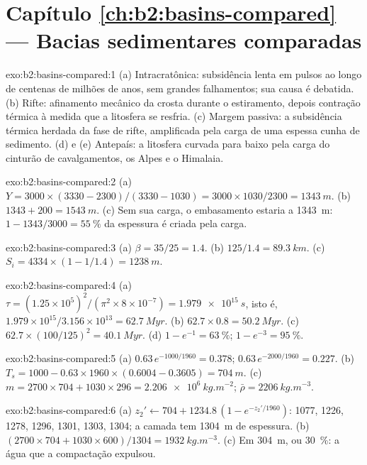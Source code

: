 \section*{Capítulo \ref{ch:b2:basins-compared} --- Bacias sedimentares comparadas}

\begin{solution}{exo:b2:basins-compared:1}
(a) Intracratônica: subsidência lenta em pulsos ao longo de centenas de milhões de anos, sem grandes
falhamentos; sua causa é debatida. (b) Rifte: afinamento mecânico da crosta durante o estiramento,
depois contração térmica à medida que a litosfera se resfria. (c) Margem passiva: a subsidência térmica
herdada da fase de rifte, amplificada pela carga de uma espessa cunha de sedimento. (d) e (e)
Antepaís: a litosfera curvada para baixo pela carga do cinturão de cavalgamentos, os Alpes e o Himalaia.
\end{solution}

\begin{solution}{exo:b2:basins-compared:2}
(a) $Y = 3000\times(3330 - 2300)/(3330 - 1030) = 3000\times1030/2300 = \qty{1343}{m}$.
(b) $1343 + 200 = \qty{1543}{m}$. (c) Sem sua carga, o embasamento estaria a \qty{1343}{m}:
$1 - 1343/3000 = \qty{55}{\percent}$ da espessura é criada pela carga.
\end{solution}

\begin{solution}{exo:b2:basins-compared:3}
(a) $\beta = 35/25 = 1.4$. (b) $125/1.4 = \qty{89.3}{km}$. (c) $S_i = 4334\times(1 - 1/1.4) =
\qty{1238}{m}$.
\end{solution}

\begin{solution}{exo:b2:basins-compared:4}
(a) $\tau = (1.25\times10^{5})^2/(\pi^2\times8\times10^{-7}) = \qty{1.979e15}{s}$, isto é,
$1.979\times10^{15}/3.156\times10^{13} = \qty{62.7}{Myr}$. (b) $62.7\times0.8 = \qty{50.2}{Myr}$.
(c) $62.7\times(100/125)^2 = \qty{40.1}{Myr}$. (d) $1 - e^{-1} = \qty{63}{\percent}$; $1 -
e^{-3} = \qty{95}{\percent}$.
\end{solution}

\begin{solution}{exo:b2:basins-compared:5}
(a) $0.63\,e^{-1000/1960} = 0.378$; $0.63\,e^{-2000/1960} = 0.227$. (b) $T_s = 1000 -
0.63\times1960\times(0.6004 - 0.3605) = \qty{704}{m}$. (c) $m = 2700\times704 + 1030\times296 =
\qty{2.206e6}{kg.m^{-2}}$; $\bar\rho = \qty{2206}{kg.m^{-3}}$.
\end{solution}

\begin{solution}{exo:b2:basins-compared:6}
(a) $z_2' \leftarrow 704 + 1234.8\,(1 - e^{-z_2'/1960})$: 1077, 1226, 1278, 1296, 1301, 1303,
1304; a camada tem \qty{1304}{m} de espessura. (b) $(2700\times704 + 1030\times600)/1304 =
\qty{1932}{kg.m^{-3}}$. (c) Em \qty{304}{m}, ou \qty{30}{\percent}: a água que a compactação
expulsou.
\end{solution}

